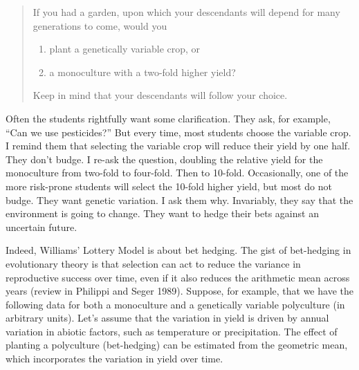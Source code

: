 \documentclass[
  letterpaper,
]{book}
\providecommand{\tightlist}{%
  \setlength{\itemsep}{0pt}\setlength{\parskip}{0pt}}\usepackage{longtable,booktabs,array}
\begin{document}
\begin{quote}
If you had a garden, upon which your descendants will depend for many
generations to come, would you

\begin{enumerate}
\def\labelenumi{\arabic{enumi}.}
\tightlist
\item
  plant a genetically variable crop, or
\item
  a monoculture with a two-fold higher yield?
\end{enumerate}

Keep in mind that your descendants will follow your choice.
\end{quote}

Often the students rightfully want some clarification. They ask, for
example, ``Can we use pesticides?'' But every time, most students choose
the variable crop. I remind them that selecting the variable crop will
reduce their yield by one half. They don't budge. I re-ask the question,
doubling the relative yield for the monoculture from two-fold to
four-fold. Then to 10-fold. Occasionally, one of the more risk-prone
students will select the 10-fold higher yield, but most do not budge.
They want genetic variation. I ask them why. Invariably, they say that
the environment is going to change. They want to hedge their bets
against an uncertain future.

Indeed, Williams' Lottery Model is about bet hedging. The gist of
bet-hedging in evolutionary theory is that selection can act to reduce
the variance in reproductive success over time, even if it also reduces
the arithmetic mean across years (review in Philippi and Seger 1989).
Suppose, for example, that we have the following data for both a
monoculture and a genetically variable polyculture (in arbitrary units).
Let's assume that the variation in yield is driven by annual variation
in abiotic factors, such as temperature or precipitation. The effect of
planting a polyculture (bet-hedging) can be estimated from the geometric
mean, which incorporates the variation in yield over time.
\end{document}
